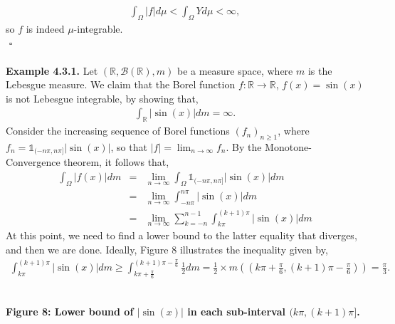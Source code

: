 \documentclass{article}
\begin{document}
\begin{eqnarray}
\nonumber
\int_\Omega |f| d\mu < \int_\Omega Y d\mu < \infty,
\end{eqnarray}
so $f$ is indeed $\mu$-integrable.\\
${}$ \hfill $\square$ \\\\
\textbf{Example 4.3.1.} Let $(\mathbb{R},\mathcal{B}(\mathbb{R}),m)$ be a measure space, where $m$ is the Lebesgue measure. We claim that the Borel function $f: \mathbb{R} \to \mathbb{R}$, $f(x) = \sin(x)$ is not Lebesgue integrable, by showing that,
\begin{eqnarray}
\nonumber
\int_\mathbb{R} |\sin(x)| dm = \infty.
\end{eqnarray}
Consider the increasing sequence of Borel functions $(f_n)_{n\geq1}$, where $f_n = \mathds{1}_{(-n\pi,n\pi]}|\sin(x)|$, so that $|f| = \lim_{n\to\infty}f_n$. By the Monotone-Convergence theorem, it follows that,
\begin{eqnarray}
\nonumber
\int_\Omega |f(x)| dm &=& \lim_{n\to\infty}\int_\Omega \mathds{1}_{(-n\pi,n\pi]}|\sin(x)| dm\\
\nonumber
&=& \lim_{n\to\infty}\int_{-n\pi}^{n\pi}|\sin(x)| dm\\
\nonumber
&=& \lim_{n\to\infty}\sum_{k=-n}^{n-1}\int_{k\pi}^{(k+1)\pi}|\sin(x)| dm
\end{eqnarray}
At this point, we need to find a lower bound to the latter equality that diverges, and then we are done. Ideally, Figure 8 illustrates the inequality given by,
\begin{eqnarray}
\nonumber
\int_{k\pi}^{(k+1)\pi}|\sin(x)| dm \geq \int_{k\pi + \frac{\pi}{6}}^{(k+1)\pi - \frac{\pi}{6}} \frac{1}{2} dm = \frac{1}{2} \times m\left(\left(k\pi + \frac{\pi}{6}, (k+1)\pi - \frac{\pi}{6}\right)\right) = \frac{\pi}{3}.
\end{eqnarray}
\begin{center}
\\
\textbf{Figure 8: Lower bound of $|\sin(x)|$ in each sub-interval $(k\pi, (k+1)\pi]$.}
\end{center}
\end{document}
